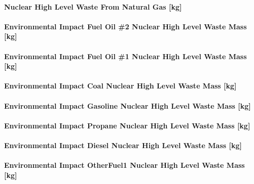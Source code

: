 \paragraph{Nuclear High Level Waste From Natural Gas {[}kg{]}}\label{nuclear-high-level-waste-from-natural-gas-kg}

\paragraph{Environmental Impact Fuel Oil \#2 Nuclear High Level Waste Mass {[}kg{]}}\label{environmental-impact-fuel-oil-2-nuclear-high-level-waste-mass-kg}

\paragraph{Environmental Impact Fuel Oil \#1 Nuclear High Level Waste Mass {[}kg{]}}\label{environmental-impact-fuel-oil-1-nuclear-high-level-waste-mass-kg}

\paragraph{Environmental Impact Coal Nuclear High Level Waste Mass {[}kg{]}}\label{environmental-impact-coal-nuclear-high-level-waste-mass-kg}

\paragraph{Environmental Impact Gasoline Nuclear High Level Waste Mass {[}kg{]}}\label{environmental-impact-gasoline-nuclear-high-level-waste-mass-kg}

\paragraph{Environmental Impact Propane Nuclear High Level Waste Mass {[}kg{]}}\label{environmental-impact-propane-nuclear-high-level-waste-mass-kg}

\paragraph{Environmental Impact Diesel Nuclear High Level Waste Mass {[}kg{]}}\label{environmental-impact-diesel-nuclear-high-level-waste-mass-kg}

\paragraph{Environmental Impact OtherFuel1 Nuclear High Level Waste Mass {[}kg{]}}\label{environmental-impact-otherfuel1-nuclear-high-level-waste-mass-kg}

